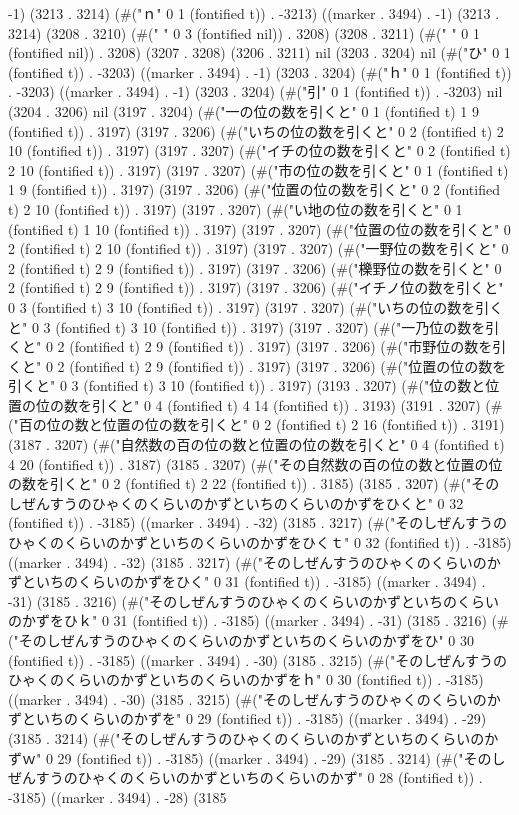 -1) (3213 . 3214) (#("ｎ" 0 1 (fontified t)) . -3213) ((marker . 3494) . -1) (3213 . 3214) (3208 . 3210) (#("   " 0 3 (fontified nil)) . 3208) (3208 . 3211) (#(" " 0 1 (fontified nil)) . 3208) (3207 . 3208) (3206 . 3211) nil (3203 . 3204) nil (#("ひ" 0 1 (fontified t)) . -3203) ((marker . 3494) . -1) (3203 . 3204) (#("ｈ" 0 1 (fontified t)) . -3203) ((marker . 3494) . -1) (3203 . 3204) (#("引" 0 1 (fontified t)) . -3203) nil (3204 . 3206) nil (3197 . 3204) (#("一の位の数を引くと" 0 1 (fontified t) 1 9 (fontified t)) . 3197) (3197 . 3206) (#("いちの位の数を引くと" 0 2 (fontified t) 2 10 (fontified t)) . 3197) (3197 . 3207) (#("イチの位の数を引くと" 0 2 (fontified t) 2 10 (fontified t)) . 3197) (3197 . 3207) (#("市の位の数を引くと" 0 1 (fontified t) 1 9 (fontified t)) . 3197) (3197 . 3206) (#("位置の位の数を引くと" 0 2 (fontified t) 2 10 (fontified t)) . 3197) (3197 . 3207) (#("い地の位の数を引くと" 0 1 (fontified t) 1 10 (fontified t)) . 3197) (3197 . 3207) (#("位置の位の数を引くと" 0 2 (fontified t) 2 10 (fontified t)) . 3197) (3197 . 3207) (#("一野位の数を引くと" 0 2 (fontified t) 2 9 (fontified t)) . 3197) (3197 . 3206) (#("櫟野位の数を引くと" 0 2 (fontified t) 2 9 (fontified t)) . 3197) (3197 . 3206) (#("イチノ位の数を引くと" 0 3 (fontified t) 3 10 (fontified t)) . 3197) (3197 . 3207) (#("いちの位の数を引くと" 0 3 (fontified t) 3 10 (fontified t)) . 3197) (3197 . 3207) (#("一乃位の数を引くと" 0 2 (fontified t) 2 9 (fontified t)) . 3197) (3197 . 3206) (#("市野位の数を引くと" 0 2 (fontified t) 2 9 (fontified t)) . 3197) (3197 . 3206) (#("位置の位の数を引くと" 0 3 (fontified t) 3 10 (fontified t)) . 3197) (3193 . 3207) (#("位の数と位置の位の数を引くと" 0 4 (fontified t) 4 14 (fontified t)) . 3193) (3191 . 3207) (#("百の位の数と位置の位の数を引くと" 0 2 (fontified t) 2 16 (fontified t)) . 3191) (3187 . 3207) (#("自然数の百の位の数と位置の位の数を引くと" 0 4 (fontified t) 4 20 (fontified t)) . 3187) (3185 . 3207) (#("その自然数の百の位の数と位置の位の数を引くと" 0 2 (fontified t) 2 22 (fontified t)) . 3185) (3185 . 3207) (#("そのしぜんすうのひゃくのくらいのかずといちのくらいのかずをひくと" 0 32 (fontified t)) . -3185) ((marker . 3494) . -32) (3185 . 3217) (#("そのしぜんすうのひゃくのくらいのかずといちのくらいのかずをひくｔ" 0 32 (fontified t)) . -3185) ((marker . 3494) . -32) (3185 . 3217) (#("そのしぜんすうのひゃくのくらいのかずといちのくらいのかずをひく" 0 31 (fontified t)) . -3185) ((marker . 3494) . -31) (3185 . 3216) (#("そのしぜんすうのひゃくのくらいのかずといちのくらいのかずをひｋ" 0 31 (fontified t)) . -3185) ((marker . 3494) . -31) (3185 . 3216) (#("そのしぜんすうのひゃくのくらいのかずといちのくらいのかずをひ" 0 30 (fontified t)) . -3185) ((marker . 3494) . -30) (3185 . 3215) (#("そのしぜんすうのひゃくのくらいのかずといちのくらいのかずをｈ" 0 30 (fontified t)) . -3185) ((marker . 3494) . -30) (3185 . 3215) (#("そのしぜんすうのひゃくのくらいのかずといちのくらいのかずを" 0 29 (fontified t)) . -3185) ((marker . 3494) . -29) (3185 . 3214) (#("そのしぜんすうのひゃくのくらいのかずといちのくらいのかずｗ" 0 29 (fontified t)) . -3185) ((marker . 3494) . -29) (3185 . 3214) (#("そのしぜんすうのひゃくのくらいのかずといちのくらいのかず" 0 28 (fontified t)) . -3185) ((marker . 3494) . -28) (3185 